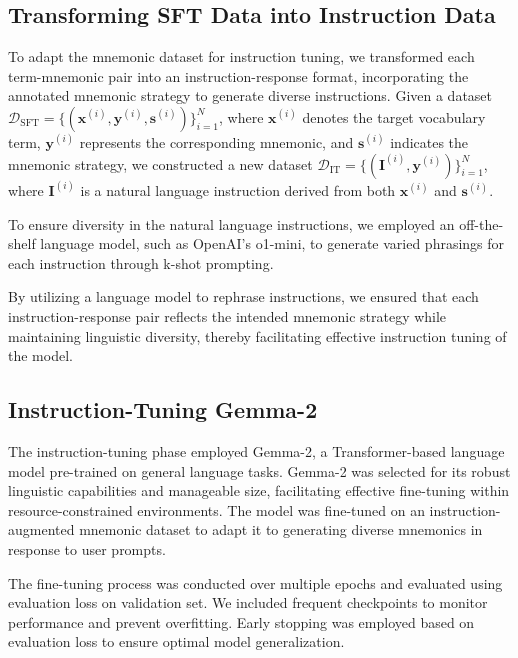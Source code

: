 \documentclass{article}
\begin{document}
\subsection{Transforming SFT Data into Instruction Data} \label{sec:met-instruction-data}

To adapt the mnemonic dataset for instruction tuning, we transformed each term-mnemonic pair into an instruction-response format, incorporating the annotated mnemonic strategy to generate diverse instructions. Given a dataset \( \mathcal{D}_{\text{SFT}} = \{(\mathbf{x}^{(i)}, \mathbf{y}^{(i)}, \mathbf{s}^{(i)})\}_{i=1}^N \), where \( \mathbf{x}^{(i)} \) denotes the target vocabulary term, \( \mathbf{y}^{(i)} \) represents the corresponding mnemonic, and \( \mathbf{s}^{(i)} \) indicates the mnemonic strategy, we constructed a new dataset \( \mathcal{D}_{\text{IT}} = \{(\mathbf{I}^{(i)}, \mathbf{y}^{(i)})\}_{i=1}^N \), where \( \mathbf{I}^{(i)} \) is a natural language instruction derived from both \( \mathbf{x}^{(i)} \) and \( \mathbf{s}^{(i)} \).

To ensure diversity in the natural language instructions, we employed an off-the-shelf language model, such as OpenAI's o1-mini, to generate varied phrasings for each instruction through k-shot prompting.

By utilizing a language model to rephrase instructions, we ensured that each instruction-response pair reflects the intended mnemonic strategy while maintaining linguistic diversity, thereby facilitating effective instruction tuning of the model.

\subsection{Instruction-Tuning Gemma-2} \label{sec:met-it-gemma}

The instruction-tuning phase employed Gemma-2, a Transformer-based language model pre-trained on general language tasks. Gemma-2 was selected for its robust linguistic capabilities and manageable size, facilitating effective fine-tuning within resource-constrained environments. The model was fine-tuned on an instruction-augmented mnemonic dataset to adapt it to generating diverse mnemonics in response to user prompts.

The fine-tuning process was conducted over multiple epochs and evaluated using evaluation loss on validation set. We included frequent checkpoints to monitor performance and prevent overfitting. Early stopping was employed based on evaluation loss to ensure optimal model generalization.
\end{document}
